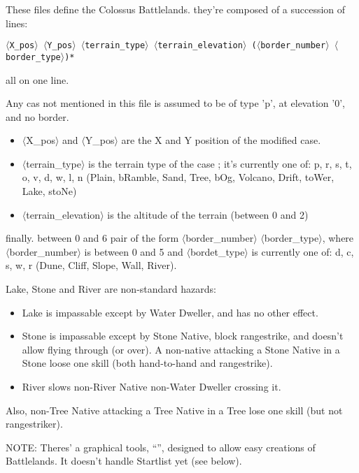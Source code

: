 \documentclass{article}
\begin{document}
These files define the Colossus Battlelands. they're composed of a succession of lines:

\texttt{$\langle$X\_pos$\rangle$ $\langle$Y\_pos$\rangle$ $\langle$terrain\_type$\rangle$ $\langle$terrain\_elevation$\rangle$ ($\langle$border\_number$\rangle$ $\langle$border\_type$\rangle$)*}

all on one line.

Any cas not mentioned in this file is assumed to be of type 'p', at elevation '0', and no border.

\begin{itemize}
\item $\langle$X\_pos$\rangle$ and $\langle$Y\_pos$\rangle$ are the X and Y position of the modified case.
\item $\langle$terrain\_type$\rangle$ is the terrain type of the case ; it's currently one of: p, r, s, t, o, v, d, w, l, n (Plain, bRamble, Sand, Tree, bOg, Volcano, Drift, toWer, Lake, stoNe)
\item $\langle$terrain\_elevation$\rangle$ is the altitude of the terrain (between 0 and 2)
\end{itemize}

finally. between 0 and 6 pair of the form $\langle$border\_number$\rangle$ $\langle$border\_type$\rangle$, where $\langle$border\_number$\rangle$ is between 0 and 5 and $\langle$bordet\_type$\rangle$ is currently one of: d, c, s, w, r (Dune, Cliff, Slope, Wall, River).

Lake, Stone and River are non-standard hazards:

\begin{itemize}
\item Lake is impassable except by Water Dweller, and has no other effect.
\item Stone is impassable except by Stone Native, block rangestrike, and doesn't allow flying through (or over). A non-native attacking a Stone Native in a Stone loose one skill (both hand-to-hand and rangestrike).
\item River slows non-River Native non-Water Dweller crossing it.
\end{itemize}

Also, non-Tree Native attacking a Tree Native in a Tree lose one skill (but not rangestriker).

NOTE: Theres' a graphical tools,
``'',
designed to allow easy creations of Battlelands. It doesn't handle Startlist yet (see below).
\end{document}
